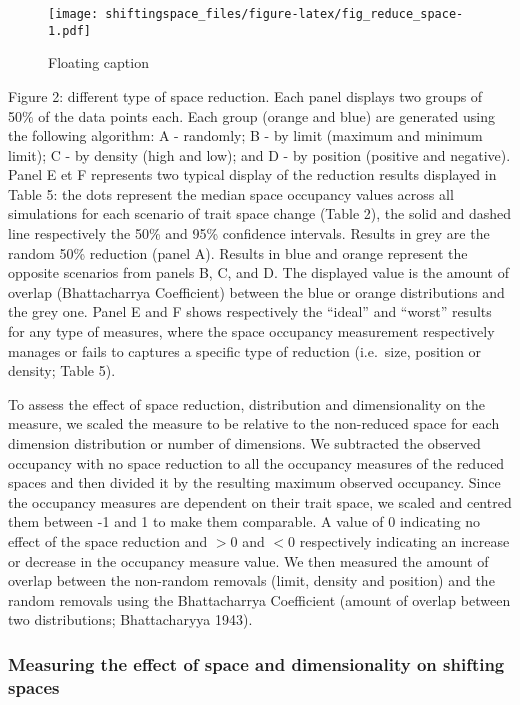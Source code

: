 \documentclass[]{article}
\begin{document}
\begin{figure}
\centering
\texttt{[image: shiftingspace\_files/figure-latex/fig\_reduce\_space-1.pdf]}
\caption{Floating caption}
\end{figure}
Figure 2: different type of space reduction. Each panel
displays two groups of 50\% of the data points each. Each group (orange
and blue) are generated using the following algorithm: A - randomly; B -
by limit (maximum and minimum limit); C - by density (high and low); and
D - by position (positive and negative). Panel E et F represents two
typical display of the reduction results displayed in Table 5: the dots
represent the median space occupancy values across all simulations for
each scenario of trait space change (Table 2), the solid and dashed line
respectively the 50\% and 95\% confidence intervals. Results in grey are
the random 50\% reduction (panel A). Results in blue and orange
represent the opposite scenarios from panels B, C, and D. The displayed
value is the amount of overlap (Bhattacharrya Coefficient) between the
blue or orange distributions and the grey one. Panel E and F shows
respectively the ``ideal'' and ``worst'' results for any type of
measures, where the space occupancy measurement respectively manages or
fails to captures a specific type of reduction (i.e.~size, position or
density; Table 5).


To assess the effect of space reduction, distribution and dimensionality
on the measure, we scaled the measure to be relative to the non-reduced
space for each dimension distribution or number of dimensions. We
subtracted the observed occupancy with no space reduction to all the
occupancy measures of the reduced spaces and then divided it by the
resulting maximum observed occupancy. Since the occupancy measures are
dependent on their trait space, we scaled and centred them between -1
and 1 to make them comparable. A value of 0 indicating no effect of the
space reduction and \(>0\) and \(<0\) respectively indicating an
increase or decrease in the occupancy measure value. We then measured
the amount of overlap between the non-random removals (limit, density
and position) and the random removals using the Bhattacharrya
Coefficient (amount of overlap between two distributions; Bhattacharyya
1943).

\subsubsection{Measuring the effect of space and dimensionality on
shifting
spaces}\label{measuring-the-effect-of-space-and-dimensionality-on-shifting-spaces}
\end{document}
